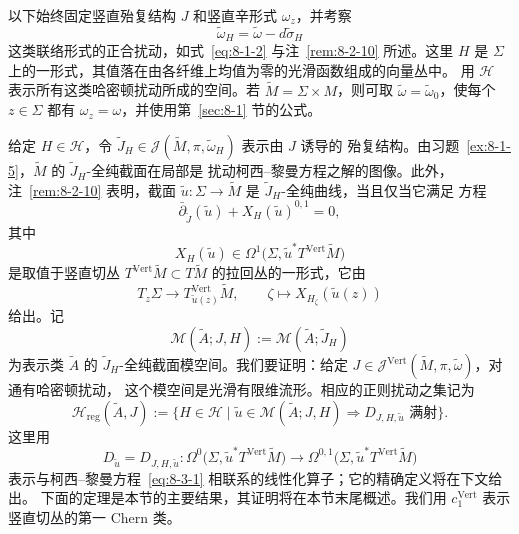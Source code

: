 以下始终固定竖直殆复结构 $J$ 和竖直辛形式 $\omega_z$，并考察
\[
  \widetilde\omega_H=\widetilde\omega-d\widetilde\sigma_H
\]
这类联络形式的正合扰动，如式~\eqref{eq:8-1-2} 与注~\ref{rem:8-2-10} 所述。这里
$H$ 是 $\Sigma$ 上的一形式，其值落在由各纤维上均值为零的光滑函数组成的向量丛中。
用 $\mathcal H$ 表示所有这类哈密顿扰动所成的空间。若
$\widetilde M=\Sigma\times M$，则可取
$\widetilde\omega=\widetilde\omega_0$，使每个 $z\in\Sigma$ 都有
$\omega_z=\omega$，并使用第~\ref{sec:8-1} 节的公式。

给定 $H\in\mathcal H$，令
$\widetilde J_H\in\mathcal J(\widetilde M,\pi,\widetilde\omega_H)$ 表示由 $J$ 诱导的
殆复结构。由习题~\ref{ex:8-1-5}，$\widetilde M$ 的 $\widetilde J_H$-全纯截面在局部是
扰动柯西--黎曼方程之解的图像。此外，注~\ref{rem:8-2-10} 表明，截面
$\widetilde u:\Sigma\to\widetilde M$ 是 $\widetilde J_H$-全纯曲线，当且仅当它满足
方程
\begin{equation}\label{eq:8-3-1}
  \bar\partial_{\widetilde J}(\widetilde u)
  +X_H(\widetilde u)^{0,1}=0,
\end{equation}
其中
\[
  X_H(\widetilde u)
  \in\Omega^1\bigl(\Sigma,\widetilde u^*T^{\mathrm{Vert}}\widetilde M\bigr)
\]
是取值于竖直切丛
$T^{\mathrm{Vert}}\widetilde M\subset T\widetilde M$ 的拉回丛的一形式，它由
\[
  T_z\Sigma\longrightarrow T^{\mathrm{Vert}}_{\widetilde u(z)}\widetilde M,
  \qquad \zeta\longmapsto X_{H_\zeta}(\widetilde u(z))
\]
给出。记
\[
  \mathcal M(\widetilde A;J,H)
  :=\mathcal M(\widetilde A;\widetilde J_H)
\]
为表示类 $\widetilde A$ 的 $\widetilde J_H$-全纯截面模空间。我们要证明：给定
$J\in\mathcal J^{\mathrm{Vert}}(\widetilde M,\pi,\widetilde\omega)$，对通有哈密顿扰动，
这个模空间是光滑有限维流形。相应的正则扰动之集记为
\begin{equation}\label{eq:8-3-2}
  \mathcal H_{\mathrm{reg}}(\widetilde A,J)
  :=\bigl\{H\in\mathcal H\mid
  \widetilde u\in\mathcal M(\widetilde A;J,H)
  \Longrightarrow D_{J,H,\widetilde u}\text{ 满射}\bigr\}.
\end{equation}
这里用
\[
  D_{\widetilde u}=D_{J,H,\widetilde u}:
  \Omega^0\bigl(\Sigma,\widetilde u^*T^{\mathrm{Vert}}\widetilde M\bigr)
  \longrightarrow
  \Omega^{0,1}\bigl(\Sigma,\widetilde u^*T^{\mathrm{Vert}}\widetilde M\bigr)
\]
表示与柯西--黎曼方程~\eqref{eq:8-3-1} 相联系的线性化算子；它的精确定义将在下文给出。
下面的定理是本节的主要结果，其证明将在本节末尾概述。我们用
$c_1^{\mathrm{Vert}}$ 表示竖直切丛的第一 Chern 类。

